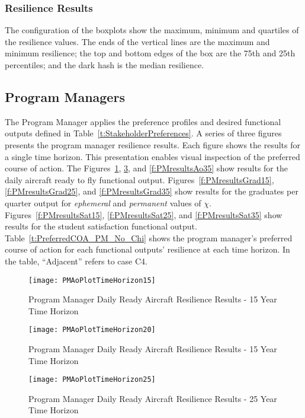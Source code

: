 \documentclass[preprint,12pt]{elsarticle}
\begin{document}
\subsubsection{Resilience Results}

The configuration of the boxplots show the maximum, minimum and
quartiles of the resilience values. The ends of the vertical lines are
the maximum and minimum resilience; the top and bottom edges  of the box are the
75th and 25th percentiles; and the dark hash is the median resilience.

\subsection{Program Managers}

The Program Manager applies the preference profiles and desired
functional outputs defined in
Table~\ref{t:StakeholderPreferences}. A series of three figures presents
the program manager resilience results. Each figure shows the results
for a single time horizon. This presentation enables visual inspection
of the preferred course of action.  The Figures~\ref{f:PMresultsAo15},
\ref{f:PMresultsAo25}, and \ref{f:PMresultsAo35} show results for
the daily aircraft ready to fly functional
output. Figures~\ref{f:PMresultsGrad15},
\ref{f:PMresultsGrad25}, and \ref{f:PMresultsGrad35} show results for
the graduates per quarter output for \emph{ephemeral} and
\emph{permanent} values of $\chi$. Figures~\ref{f:PMresultsSat15},
\ref{f:PMresultsSat25}, and \ref{f:PMresultsSat35} show results for
the student satisfaction functional output. Table~\ref{t:PreferredCOA_PM_No_Chi} shows the program
manager's preferred course of action for each 
functional outputs' resilience at each time horizon. In the table,
``Adjacent'' refers to case C4.
\begin{figure}[h]
  \centering\texttt{[image: PMAoPlotTimeHorizon15]}
  \caption{Program Manager Daily Ready Aircraft Resilience Results - 15 Year Time Horizon}
  \label{f:PMresultsAo15}
\end{figure}

\begin{figure}[h]
  \centering\texttt{[image: PMAoPlotTimeHorizon20]}
  \caption{Program Manager Daily Ready Aircraft Resilience Results - 15 Year Time Horizon}
  \label{f:PMresultsAo20}
\end{figure}

\begin{figure}[h]
  \centering\texttt{[image: PMAoPlotTimeHorizon25]}
  \caption{Program Manager Daily Ready Aircraft Resilience Results - 25 Year Time Horizon}
  \label{f:PMresultsAo25}
\end{figure}
\end{document}
